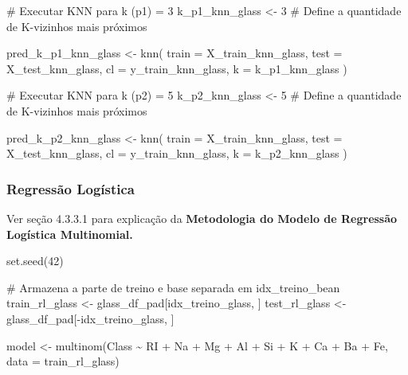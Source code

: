 \documentclass[
  letterpaper,
  DIV=11,
  numbers=noendperiod]{scrartcl}
\newenvironment{Shaded}{\begin{snugshade}}{\end{snugshade}}
\newcommand{\AttributeTok}[1]{\textcolor[rgb]{0.40,0.45,0.13}{#1}}
\newcommand{\CommentTok}[1]{\textcolor[rgb]{0.37,0.37,0.37}{#1}}
\newcommand{\DecValTok}[1]{\textcolor[rgb]{0.68,0.00,0.00}{#1}}
\newcommand{\FunctionTok}[1]{\textcolor[rgb]{0.28,0.35,0.67}{#1}}
\newcommand{\NormalTok}[1]{\textcolor[rgb]{0.00,0.23,0.31}{#1}}
\newcommand{\OtherTok}[1]{\textcolor[rgb]{0.00,0.23,0.31}{#1}}
\newcommand{\SpecialCharTok}[1]{\textcolor[rgb]{0.37,0.37,0.37}{#1}}
\begin{document}
\begin{Shaded}
\begin{Highlighting}[]
\CommentTok{\# Executar KNN para k (p1) = 3}
\NormalTok{k\_p1\_knn\_glass }\OtherTok{\textless{}{-}} \DecValTok{3} \CommentTok{\# Define a quantidade de K{-}vizinhos mais próximos}

\NormalTok{pred\_k\_p1\_knn\_glass }\OtherTok{\textless{}{-}} \FunctionTok{knn}\NormalTok{(}
  \AttributeTok{train =}\NormalTok{ X\_train\_knn\_glass,}
  \AttributeTok{test  =}\NormalTok{ X\_test\_knn\_glass,}
  \AttributeTok{cl    =}\NormalTok{ y\_train\_knn\_glass,}
  \AttributeTok{k     =}\NormalTok{ k\_p1\_knn\_glass}
\NormalTok{)}

\CommentTok{\# Executar KNN para k (p2) = 5}
\NormalTok{k\_p2\_knn\_glass }\OtherTok{\textless{}{-}} \DecValTok{5} \CommentTok{\# Define a quantidade de K{-}vizinhos mais próximos}

\NormalTok{pred\_k\_p2\_knn\_glass }\OtherTok{\textless{}{-}} \FunctionTok{knn}\NormalTok{(}
  \AttributeTok{train =}\NormalTok{ X\_train\_knn\_glass,}
  \AttributeTok{test  =}\NormalTok{ X\_test\_knn\_glass,}
  \AttributeTok{cl    =}\NormalTok{ y\_train\_knn\_glass,}
  \AttributeTok{k     =}\NormalTok{ k\_p2\_knn\_glass}
\NormalTok{)}
\end{Highlighting}
\end{Shaded}

\subsubsection{Regressão Logística}\label{regressuxe3o-loguxedstica-1}

Ver seção 4.3.3.1 para explicação da \textbf{Metodologia do Modelo de
Regressão Logística Multinomial.}

\begin{Shaded}
\begin{Highlighting}[]
\FunctionTok{set.seed}\NormalTok{(}\DecValTok{42}\NormalTok{)}

\CommentTok{\# Armazena a parte de treino e base separada em idx\_treino\_bean}
\NormalTok{train\_rl\_glass }\OtherTok{\textless{}{-}}\NormalTok{ glass\_df\_pad[idx\_treino\_glass, ]}
\NormalTok{test\_rl\_glass }\OtherTok{\textless{}{-}}\NormalTok{ glass\_df\_pad[}\SpecialCharTok{{-}}\NormalTok{idx\_treino\_glass, ]}
 
 
\NormalTok{model }\OtherTok{\textless{}{-}} \FunctionTok{multinom}\NormalTok{(Class }\SpecialCharTok{\textasciitilde{}}\NormalTok{ RI }\SpecialCharTok{+}\NormalTok{ Na }\SpecialCharTok{+}\NormalTok{ Mg }\SpecialCharTok{+}\NormalTok{ Al }\SpecialCharTok{+}\NormalTok{ Si }\SpecialCharTok{+}\NormalTok{ K }\SpecialCharTok{+}\NormalTok{ Ca }\SpecialCharTok{+}\NormalTok{ Ba }\SpecialCharTok{+}\NormalTok{ Fe, }\AttributeTok{data =}\NormalTok{ train\_rl\_glass)}
\end{Highlighting}
\end{Shaded}
\end{document}
